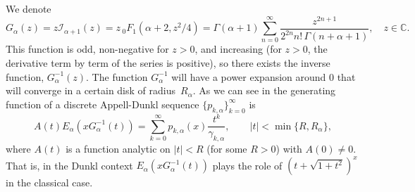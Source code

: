 \documentclass[11pt,a4paper]{article}
\theoremstyle{plain}
\theoremstyle{remark}
\newcommand{\I}{\mathcal{I}}
\newcommand{\Ea}{E_{\alpha}}
\newcommand{\CC}{\mathbb{C}}
\newcommand{\cc}{\gamma}
\begin{document}
We denote 
\[
  G_{\alpha}(z) = z \I_{\alpha+1}(z) = z \,{}_0F_1(\alpha+2,z^2/4)
  = \Gamma(\alpha+1) \sum_{n=0}^\infty \frac{z^{2n+1}}{2^{2n} n!\,\Gamma(n+\alpha+1)},
  \quad z\in\CC.
\]
This function is odd, non-negative for $z>0$, and increasing (for $z>0$, the derivative term by term of the series is positive),
so there exists the inverse function, $G^{-1}_{\alpha}(z)$. The function $G_{\alpha}^{-1}$ will have a power expansion around $0$ that will converge in a certain disk of radius~$R_{\alpha}$.
As we can see in \cite{ELMV} the generating function of a discrete Appell-Dunkl sequence $\{p_{k,\alpha}\}_{k=0}^{\infty}$ is
\begin{equation}
\label{eq:defADd}
  A(t) \Ea(x G_{\alpha}^{-1}(t)) = \sum_{k=0}^{\infty} p_{k,\alpha}(x) \frac{t^k}{\cc_{k,\alpha}},
  \qquad |t|<\min\{R,R_{\alpha}\},
\end{equation}
where $A(t)$ is a function analytic on $|t|<R$ (for some $R>0$) with $A(0)\ne 0$.
That is, in the Dunkl context $\Ea(xG_{\alpha}^{-1}(t))$ plays the role of $(t+\sqrt{1+t^2})^x$ in the classical case.
\end{document}
